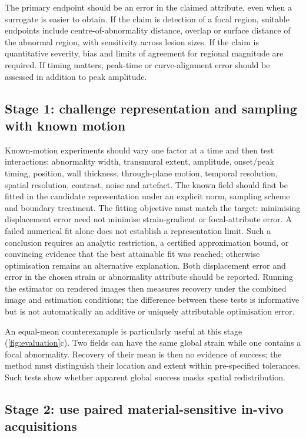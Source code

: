 The primary endpoint should be an error in the claimed attribute, even when a surrogate is easier to obtain. If the claim is detection of a focal region, suitable endpoints include centre-of-abnormality distance, overlap or surface distance of the abnormal region, with sensitivity across lesion sizes. If the claim is quantitative severity, bias and limits of agreement for regional magnitude are required. If timing matters, peak-time or curve-alignment error should be assessed in addition to peak amplitude.

\subsection{Stage 1: challenge representation and sampling with known motion}

Known-motion experiments should vary one factor at a time and then test interactions: abnormality width, transmural extent, amplitude, onset/peak timing, position, wall thickness, through-plane motion, temporal resolution, spatial resolution, contrast, noise and artefact. The known field should first be fitted in the candidate representation under an explicit norm, sampling scheme and boundary treatment. The fitting objective must match the target: minimising displacement error need not minimise strain-gradient or focal-attribute error. A failed numerical fit alone does not establish a representation limit. Such a conclusion requires an analytic restriction, a certified approximation bound, or convincing evidence that the best attainable fit was reached; otherwise optimisation remains an alternative explanation. Both displacement error and error in the chosen strain or abnormality attribute should be reported. Running the estimator on rendered images then measures recovery under the combined image and estimation conditions; the difference between these tests is informative but is not automatically an additive or uniquely attributable optimisation error.

An equal-mean counterexample is particularly useful at this stage (\cref{fig:evaluation}c). Two fields can have the same global strain while one contains a focal abnormality. Recovery of their mean is then no evidence of success; the method must distinguish their location and extent within pre-specified tolerances. Such tests show whether apparent global success masks spatial redistribution.

\subsection{Stage 2: use paired material-sensitive in-vivo acquisitions}

